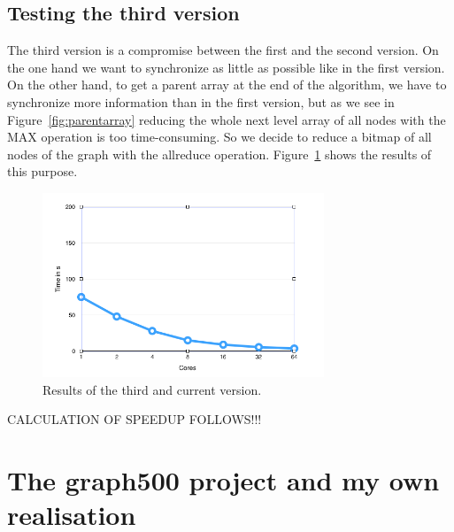\documentclass[12pt,a4paper]{article}
\begin{document}
\subsection{Testing the third version}

The third version is a compromise between the first and the second version. On the one hand we want to synchronize as little as possible like in the first version. On the other hand, to get a parent array at the end of the algorithm, we have to synchronize more information than in the first version, but as we see in Figure~\ref{fig:parentarray} reducing the whole next level array of all nodes with the MAX operation is too time-consuming. So we decide to reduce a bitmap of all nodes of the graph with the allreduce operation. Figure~\ref{fig:allvisited} shows the results of this purpose.

\begin{figure}[H]
   \centering
   \includegraphics[width=0.75\textwidth]{allvisited}
   \caption{Results of the third and current version.}
   \label{fig:allvisited}
\end{figure}

CALCULATION OF SPEEDUP FOLLOWS!!!

\section{The graph500 project and my own realisation}
\label{sec:graph500}
\end{document}
